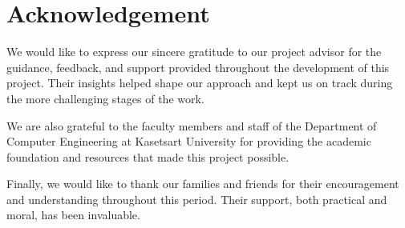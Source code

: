 \chapter*{Acknowledgement}
\label{chap:acknowledgement}

We would like to express our sincere gratitude to our project advisor for the guidance, feedback, and support provided throughout the development of this project. Their insights helped shape our approach and kept us on track during the more challenging stages of the work.

We are also grateful to the faculty members and staff of the Department of Computer Engineering at Kasetsart University for providing the academic foundation and resources that made this project possible.

Finally, we would like to thank our families and friends for their encouragement and understanding throughout this period. Their support, both practical and moral, has been invaluable.


\vspace{.2in}
\begin{flushright}
    \usevar{\srsAuthorOne} \\
    \usevar{\srsAuthorTwo}
\end{flushright}
